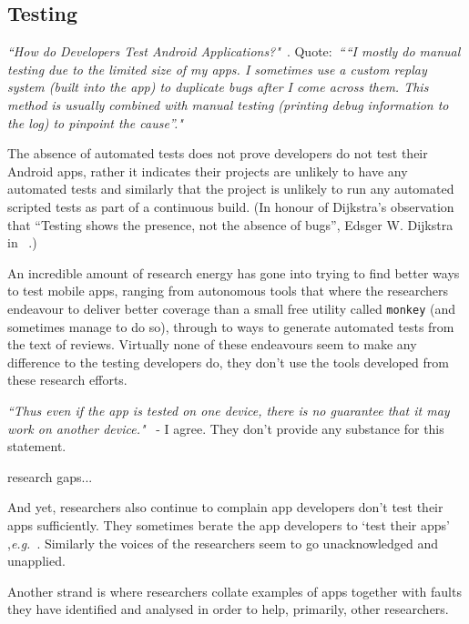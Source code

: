 \subsection{Testing}
\emph{``How do Developers Test Android Applications?"}~\citep{linares2017_how_do_developers_test_android_apps}. Quote:~\emph{``“I mostly do manual testing due to the limited size of my apps. I sometimes use a custom replay system (built into the app) to duplicate bugs after I come across them. This method is usually combined with manual testing (printing debug information to the log) to pinpoint the cause”."}

The absence of automated tests does not prove developers do not test their Android apps, rather it indicates their projects are unlikely to have any automated tests and similarly that the project is unlikely to run any automated scripted tests as part of a continuous build. (In honour of Dijkstra's observation that ``Testing shows the presence, not the absence of bugs'', Edsger W. Dijkstra in ~\citet[p. 16]{randell1970_software_engineering_techniques_nato_dijkstra}.) %

An incredible amount of research energy has gone into trying to find better ways to test mobile apps, ranging from autonomous tools that where the researchers endeavour to deliver better coverage than a small free utility called \texttt{monkey} (and sometimes manage to do so), through to ways to generate automated tests from the text of reviews. Virtually none of these endeavours seem to make any difference to the testing developers do, they don't use the tools developed from these research efforts. 

\emph{``Thus even if the app is tested on one device, there is no guarantee that it may work on another device."}~\citep[p. 27]{nagappan2016_future_trends_in_sw_eng_for_mobile_apps} - I agree. They don't provide any substance for this statement.

research gaps...

And yet, researchers also continue to complain app developers don't test their apps sufficiently. They sometimes berate the app developers to `test their apps' ,\emph{e.g.}~\citet{cruz2019_guess_what_test_your_app}.
Similarly the voices of the researchers seem to go unacknowledged and unapplied.

Another strand is where researchers collate examples of apps together with faults they have identified and analysed in order to help, primarily, other researchers. 

